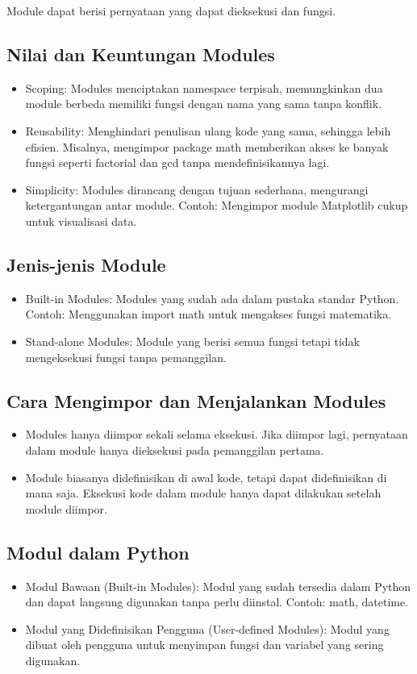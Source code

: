 \documentclass{article}
\begin{document}
Module dapat berisi pernyataan yang dapat dieksekusi dan fungsi.

\subsection{Nilai dan Keuntungan Modules}
\begin{itemize}
    \item Scoping: Modules menciptakan namespace terpisah, memungkinkan dua module berbeda memiliki fungsi dengan nama yang sama tanpa konflik.
    \item Reusability: Menghindari penulisan ulang kode yang sama, sehingga lebih efisien. Misalnya, mengimpor package math memberikan akses ke banyak fungsi seperti factorial dan gcd tanpa mendefinisikannya lagi.
    \item Simplicity: Modules dirancang dengan tujuan sederhana, mengurangi ketergantungan antar module. Contoh: Mengimpor module Matplotlib cukup untuk visualisasi data.
\end{itemize}

\subsection{Jenis-jenis Module}
\begin{itemize}
    \item Built-in Modules: Modules yang sudah ada dalam pustaka standar Python. Contoh: Menggunakan import math untuk mengakses fungsi matematika.
    \item Stand-alone Modules: Module yang berisi semua fungsi tetapi tidak mengeksekusi fungsi tanpa pemanggilan.
\end{itemize}

\subsection{Cara Mengimpor dan Menjalankan Modules}
\begin{itemize}
    \item Modules hanya diimpor sekali selama eksekusi. Jika diimpor lagi, pernyataan dalam module hanya dieksekusi pada pemanggilan pertama.
    \item Module biasanya didefinisikan di awal kode, tetapi dapat didefinisikan di mana saja. Eksekusi kode dalam module hanya dapat dilakukan setelah module diimpor.
\end{itemize}

\subsection{Modul dalam Python}
\begin{itemize}
    \item Modul Bawaan (Built-in Modules): Modul yang sudah tersedia dalam Python dan dapat langsung digunakan tanpa perlu diinstal. Contoh: math, datetime.
    \item Modul yang Didefinisikan Pengguna (User-defined Modules): Modul yang dibuat oleh pengguna untuk menyimpan fungsi dan variabel yang sering digunakan.
\end{itemize}
\end{document}
